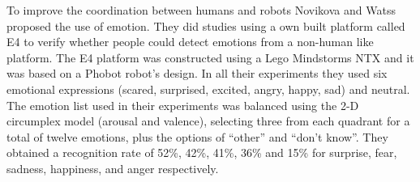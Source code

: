 To improve the coordination between humans and robots Novikova and Watss~\cite{Novika2015} proposed the use of emotion. They did studies using a own built platform called E4 to verify whether people could detect emotions from a non-human like platform. The E4 platform was constructed using a Lego Mindstorms NTX and it was based on a Phobot robot's design. In all their experiments they used six emotional expressions (scared, surprised, excited, angry, happy, sad) and neutral. The emotion list used in their experiments was balanced using the 2-D circumplex model (arousal and valence), selecting three from each quadrant for a total of twelve emotions, plus the options of ``other'' and ``don't know''. They obtained a recognition rate of 52\%, 42\%, 41\%, 36\% and 15\% for surprise, fear, sadness, happiness, and anger respectively.